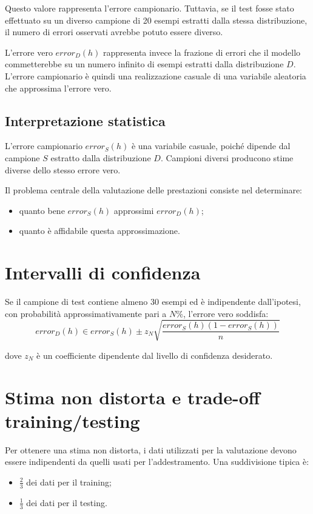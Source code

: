\documentclass[a4paper,12pt]{report}
\begin{document}
Questo valore rappresenta l’errore campionario.
Tuttavia, se il test fosse stato effettuato su un diverso campione di 20 esempi estratti dalla stessa distribuzione, il numero di errori osservati avrebbe potuto essere diverso.

L’errore vero \( error_D(h) \) rappresenta invece la frazione di errori che il modello commetterebbe su un numero infinito di esempi estratti dalla distribuzione \( D \).
L’errore campionario è quindi una realizzazione casuale di una variabile aleatoria che approssima l’errore vero.

\subsection*{Interpretazione statistica}

L’errore campionario \( error_S(h) \) è una variabile casuale, poiché dipende dal campione \( S \) estratto dalla distribuzione \( D \).
Campioni diversi producono stime diverse dello stesso errore vero.

Il problema centrale della valutazione delle prestazioni consiste nel determinare:
\begin{itemize}
    \item quanto bene \( error_S(h) \) approssimi \( error_D(h) \);
    \item quanto è affidabile questa approssimazione.
\end{itemize}



\section{Intervalli di confidenza}

Se il campione di test contiene almeno 30 esempi ed è indipendente dall’ipotesi,
con probabilità approssimativamente pari a \( N\% \), l’errore vero soddisfa:
\[
error_D(h) \in error_S(h) \pm z_N
\sqrt{\frac{error_S(h)(1 - error_S(h))}{n}}
\]

dove \( z_N \) è un coefficiente dipendente dal livello di confidenza desiderato.

\section{Stima non distorta e trade-off training/testing}

Per ottenere una stima non distorta, i dati utilizzati per la valutazione devono essere indipendenti da quelli usati per l’addestramento.
Una suddivisione tipica è:
\begin{itemize}
    \item \( \frac{2}{3} \) dei dati per il training;
    \item \( \frac{1}{3} \) dei dati per il testing.
\end{itemize}
\end{document}
